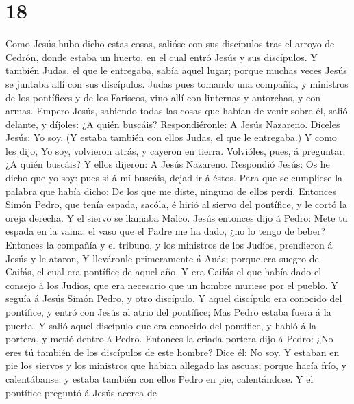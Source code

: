 \hypertarget{section-17}{%
\section{18}\label{section-17}}

 Como Jesús hubo dicho estas cosas, salióse con sus
discípulos tras el arroyo de Cedrón, donde estaba un huerto, en el cual
entró Jesús y sus discípulos.  Y también Judas, el que le
entregaba, sabía aquel lugar; porque muchas veces Jesús se juntaba allí
con sus discípulos.  Judas pues tomando una compañía, y
ministros de los pontífices y de los Fariseos, vino allí con linternas y
antorchas, y con armas.  Empero Jesús, sabiendo todas las
cosas que habían de venir sobre él, salió delante, y díjoles: ¿A quién
buscáis?  Respondiéronle: A Jesús Nazareno. Díceles Jesús:
Yo soy. (Y estaba también con ellos Judas, el que le entregaba.)
 Y como les dijo, Yo soy, volvieron atrás, y cayeron en
tierra.  Volvióles, pues, á preguntar: ¿A quién buscáis? Y
ellos dijeron: A Jesús Nazareno.  Respondió Jesús: Os he
dicho que yo soy: pues si á mí buscáis, dejad ir á éstos. 
Para que se cumpliese la palabra que había dicho: De los que me diste,
ninguno de ellos perdí.  Entonces Simón Pedro, que tenía
espada, sacóla, é hirió al siervo del pontífice, y le cortó la oreja
derecha. Y el siervo se llamaba Malco.  Jesús entonces dijo
á Pedro: Mete tu espada en la vaina: el vaso que el Padre me ha dado,
¿no lo tengo de beber?  Entonces la compañía y el tribuno,
y los ministros de los Judíos, prendieron á Jesús y le ataron,
 Y lleváronle primeramente á Anás; porque era suegro de
Caifás, el cual era pontífice de aquel año.  Y era Caifás
el que había dado el consejo á los Judíos, que era necesario que un
hombre muriese por el pueblo.  Y seguía á Jesús Simón
Pedro, y otro discípulo. Y aquel discípulo era conocido del pontífice, y
entró con Jesús al atrio del pontífice;  Mas Pedro estaba
fuera á la puerta. Y salió aquel discípulo que era conocido del
pontífice, y habló á la portera, y metió dentro á Pedro. 
Entonces la criada portera dijo á Pedro: ¿No eres tú también de los
discípulos de este hombre? Dice él: No soy.  Y estaban en
pie los siervos y los ministros que habían allegado las ascuas; porque
hacía frío, y calentábanse: y estaba también con ellos Pedro en pie,
calentándose.  Y el pontífice preguntó á Jesús acerca de
